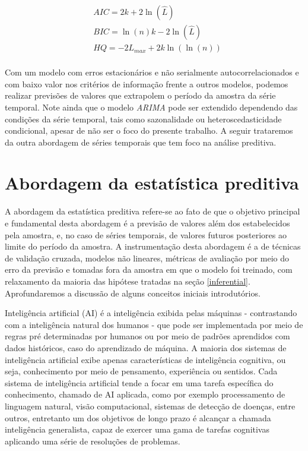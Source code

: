 \documentclass[twocolumn]{rbef}
\newcommand{\1}{\mathbbm{1}}
\begin{document}
\begin{equation}
    \begin{split}
        & AIC = 2k + 2 \ln (\hat{L}) \\
        & BIC = \ln (n) k - 2 \ln (\hat{L}) \\
        & HQ = -2 L_{max} + 2k \ln (\ln (n)) \\
    \end{split}
\end{equation}

Com um modelo com erros estacionários e não serialmente autocorrelacionados e com baixo valor nos critérios de informação frente a outros modelos, podemos realizar previsões \cite{Hamilton} de valores que extrapolem o período da amostra da série temporal. Note ainda que o modelo \textit{ARIMA} pode ser extendido dependendo das condições da série temporal, tais como sazonalidade ou heteroscedasticidade condicional\cite{Brockwell}, apesar de não ser o foco do presente trabalho. A seguir trataremos da outra abordagem de séries temporais que tem foco na análise preditiva.

\section{Abordagem da estatística preditiva} \label{predictive}

A abordagem da estatística preditiva refere-se ao fato de que o objetivo principal e fundamental desta abordagem é a previsão de valores além dos estabelecidos pela amostra, e, no caso de séries temporais, de valores futuros posteriores ao limite do período da amostra. A instrumentação desta abordagem é a de técnicas de validação cruzada, modelos não lineares, métricas de avaliação por meio do erro da previsão e tomadas fora da amostra em que o modelo foi treinado, com relaxamento da maioria das hipótese tratadas na seção \ref{inferential}. Aprofundaremos a discussão de alguns conceitos iniciais introdutórios.

Inteligência artificial (AI) é a inteligência exibida pelas máquinas - contrastando com a inteligência natural dos humanos - que pode ser implementada por meio de regras pré determinadas por humanos ou por meio de padrões aprendidos com dados históricos, caso do aprendizado de máquina\cite{Oliver}. A maioria dos sistemas de inteligência artificial exibe apenas características de inteligência cognitiva, ou seja, conhecimento por meio de pensamento, experiência ou sentidos. Cada sistema de inteligência artificial tende a focar em uma tarefa específica do conhecimento, chamado de AI aplicada, como por exemplo processamento de linguagem natural, visão computacional, sistemas de detecção de doenças, entre outros, entretanto um dos objetivos de longo prazo é alcançar a chamada inteligência generalista, capaz de exercer uma gama de tarefas cognitivas aplicando uma série de resoluções de problemas\cite{Laird}.
\end{document}
